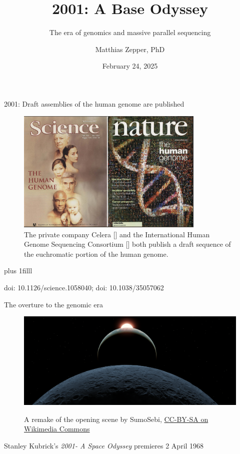 \documentclass[10pt]{beamer}
\title{2001: A Base Odyssey}
\subtitle{The era of genomics and massive parallel sequencing}
\date{February 24, 2025}
\author{Matthias Zepper, PhD}
\institute{NGI Stockholm\par \href{https://ngisweden.scilifelab.se}{https://ngisweden.scilifelab.se}}
\newcommand{\credit}[1]{{\vskip0pt plus 1filll \par \raggedleft \scriptsize \mdseries \color{mDarkBrown} #1 \par}}
\newcommand{\creditdarknofill}[1]{{\par \raggedleft \scriptsize \mdseries \color{scMGray} #1 \par}}
\newcommand{\citeme}[1]{{\xspace\color{scAqua} \scriptsize [\cite{#1}]}}
\begin{document}
\maketitle

\begin{frame}{2001: Draft assemblies of the human genome are published}
	\begin{figure}
		\includegraphics[width=0.8\textwidth]{figures/humangenomeproject.png}
		\caption{The private company Celera\citeme{Venter2001} and the International Human Genome Sequencing Consortium\citeme{Lander2001} both publish a draft sequence of the euchromatic portion of the human genome.}
	\end{figure}
	\credit{doi: 10.1126/science.1058040; doi: 10.1038/35057062}
\end{frame}

\begin{frame}[standout]{The overture to the genomic era}
	\begin{figure}
		\hspace*{-1.1cm}
		\includegraphics[width=1.25\textwidth]{./additional_graphics/Opening_2001-_A_Space_Odyssey.png}
		\creditdarknofill{A remake of the opening scene by SumoSebi, \href{https://commons.wikimedia.org/wiki/File:Opening_2001-_A_Space_Odyssey.png}{CC-BY-SA on Wikimedia Commons}}
	\end{figure}
	{\small	Stanley Kubrick's \emph{2001- A Space Odyssey} premieres  2 April 1968}

\end{frame}
\end{document}
